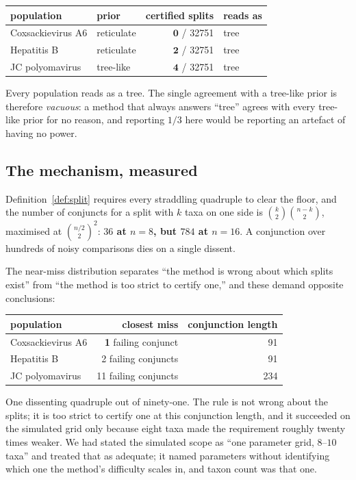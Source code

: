 \documentclass[11pt,a4paper]{article}
\theoremstyle{definition}
\theoremstyle{remark}
\begin{document}
\begin{center}\footnotesize
\begin{tabular}{@{}llrl@{}}
\toprule
population & prior & certified splits & reads as \\
\midrule
Coxsackievirus A6 & reticulate & $\mathbf{0}$ / 32751 & tree \\
Hepatitis B & reticulate & $\mathbf{2}$ / 32751 & tree \\
JC polyomavirus & tree-like & $\mathbf{4}$ / 32751 & tree \\
\bottomrule
\end{tabular}
\end{center}

Every population reads as a tree. The single agreement with a tree-like prior is
therefore \emph{vacuous}: a method that always answers ``tree'' agrees with every
tree-like prior for no reason, and reporting $1/3$ here would be reporting an
artefact of having no power.

\subsection{The mechanism, measured}

Definition~\ref{def:split} requires every straddling quadruple to clear the
floor, and the number of conjuncts for a split with $k$ taxa on one side is
$\binom{k}{2}\binom{n-k}{2}$, maximised at $\binom{n/2}{2}^2$: \textbf{$36$ at
$n = 8$, but $784$ at $n = 16$}. A conjunction over hundreds of noisy comparisons
dies on a single dissent.

The near-miss distribution separates ``the method is wrong about which splits
exist'' from ``the method is too strict to certify one,'' and these demand
opposite conclusions:

\begin{center}\footnotesize
\begin{tabular}{@{}lrr@{}}
\toprule
population & closest miss & conjunction length \\
\midrule
Coxsackievirus A6 & \textbf{1} failing conjunct & 91 \\
Hepatitis B & 2 failing conjuncts & 91 \\
JC polyomavirus & 11 failing conjuncts & 234 \\
\bottomrule
\end{tabular}
\end{center}

One dissenting quadruple out of ninety-one. The rule is not wrong about the
splits; it is too strict to certify one at this conjunction length, and it
succeeded on the simulated grid only because eight taxa made the requirement
roughly twenty times weaker. We had stated the simulated scope as ``one parameter
grid, $8$--$10$ taxa'' and treated that as adequate; it named parameters without
identifying which one the method's difficulty scales in, and taxon count was that
one.
\end{document}
